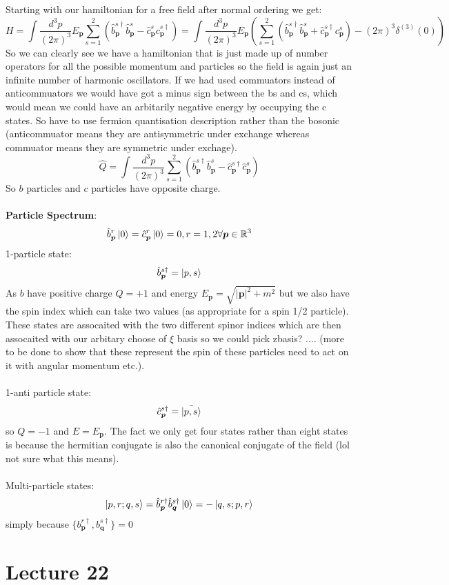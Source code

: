 \documentclass[12pt, a4paper, twoside, titlepage]{article}
\begin{document}
\begin{pmartix}
Starting with our hamiltonian for a free field after normal ordering we get:
$$
H = \int \frac{d^3 p}{(2 \pi)^3} E_{\bm p} \sum_{s=1}^2 (\hat b^{s \dagger}_{\bm p} \hat b^s_{\bm p} - \hat c^{s}_{\bm p} c^{s \dagger}_{\bm p}) =  \int \frac{d^3 p}{(2 \pi)^3} E_{\bm p} (\sum_{s=1}^2 (\hat b^{s \dagger}_{\bm p} \hat b^s_{\bm p} + \hat c^{s \dagger}_{\bm p} c^{s}_{\bm p} )- (2\pi)^3 \delta^{(3)}(0)) 
$$
So we can clearly see we have a hamiltonian that is just made up of number operators for all the possible momentum and particles so the field is again just an infinite number of harmonic oscillators. If we had used commuators instead of anticommuators we would have got a minus sign between the bs and cs, which would mean we could have an arbitarily negative energy by occupying the c states. So have to use fermion quantisation description rather than the bosonic (anticommuator means they are antisymmetric under exchange whereas commuator means they are symmetric under exchage).
$$
\hat Q = \int \frac{d^3 p}{(2\pi)^3} \sum_{s=1}^2 (\hat b^{s \dagger}_{\bm p} \hat b^s_{\bm p} - \hat c^{s \dagger}_{\bm p} \hat c^s_{\bm p})
$$
So $b$ particles and $c$ particles have opposite charge.\\\\
\textbf{Particle Spectrum}:
$$
\hat b^{r}_{\bm p}\ket{0} = \hat c^r_{\bm p} \ket{0} = 0, r= 1,2 \forall \bm p \in \mathbb{R}^3
$$
1-particle state:
$$
\hat b^{s \dagger}_{\bm p} = \ket{p,s}
$$
As $b$ have positive charge $Q=+1$ and energy $E_{\bm p} = \sqrt{|\bm p|^2 + m^2}$ but we also have the spin index which can take two values (as appropriate for a spin 1/2 particle). These states are assocaited with the two different spinor indices which are then assocaited with our arbitary choose of $\xi$ basis so we could pick zbasis? .... (more to be done to show that these represent the spin of these particles need to act on it with angular momentum etc.).\\\\
1-anti particle state:
$$
\hat c^{s \dagger}_{\bm p} = \bar{\ket{p,s}}
$$
so $Q=-1$ and $E = E_{\bm p}$. The fact we only get four states rather than eight states is because the hermitian conjugate is also the canonical conjugate of the field (lol not sure what this means).\\\\
Multi-particle states:
$$
\ket{p,r ; q,s} = \hat b^{r \dagger}_{\bm p} \hat b^{ s \dagger}_{\bm q} \ket{0} = -\ket{q,s; p,r}
$$
simply because $\{b_{\bm p}^{r \dagger}, b_{\bm q}^{s \dagger}\} = 0$
\section{Lecture 22}

\end{pmartix}
\end{document}
